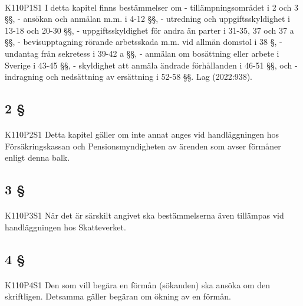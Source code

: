 \documentclass[a4paper,notitlepage,openany,10pt]{book}
\begin{document}
\paragraph*{}
{\tiny K110P1S1}
I detta kapitel finns bestämmelser om
\newline - tillämpningsområdet i 2 och 3 §§,
\newline - ansökan och anmälan m.m. i 4-12 §§,
\newline - utredning och uppgiftsskyldighet i 13-18 och 20-30 §§,
\newline - uppgiftsskyldighet för andra än parter i 31-35, 37 och 37 a §§,
\newline - bevisupptagning rörande arbetsskada m.m. vid allmän domstol i 38 §,
\newline - undantag från sekretess i 39-42 a §§,
\newline - anmälan om bosättning eller arbete i Sverige i 43-45 §§,
\newline - skyldighet att anmäla ändrade förhållanden i 46-51 §§, och
\newline - indragning och nedsättning av ersättning i 52-58 §§.
Lag (2022:938).
\subsection*{2 §}
\paragraph*{}
{\tiny K110P2S1}
Detta kapitel gäller om inte annat anges vid handläggningen hos Försäkringskassan och Pensionsmyndigheten av ärenden som avser förmåner enligt denna balk.
\subsection*{3 §}
\paragraph*{}
{\tiny K110P3S1}
När det är särskilt angivet ska bestämmelserna även tillämpas vid handläggningen hos Skatteverket.
\subsection*{4 §}
\paragraph*{}
{\tiny K110P4S1}
Den som vill begära en förmån (sökanden) ska ansöka om den skriftligen. Detsamma gäller begäran om ökning av en förmån.
\end{document}

